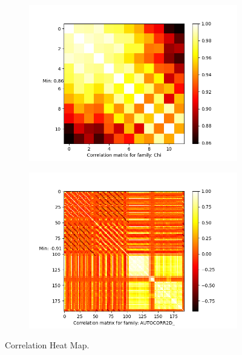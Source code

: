 \documentclass[11pt]{article}
\begin{document}
\begin{figure}[htb]
    \begin{subfigure}[b]{0.45\textwidth}
         \centering
         \includegraphics[scale=0.45]{images/correlationChi}
        \label{fig:correlationChi}
     \end{subfigure}
     \hfill
    \begin{subfigure}[b]{0.45\textwidth}
         \centering
         \includegraphics[scale=0.45]{images/correlationAUTOCORR2D}
        \label{fig:correlationfr}
     \end{subfigure}
     \caption{Correlation Heat Map.}
     \label{fig:correlationheatmap}
\end{figure}
\end{document}
